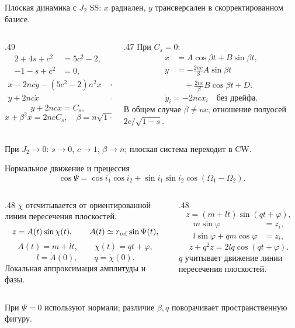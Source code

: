 \documentclass[11pt,aspectratio=169,t]{beamer}
\newcommand{\eqcompact}{\fontsize{10}{12}\selectfont}
\newcommand{\derivationmathspacing}{%
  \setlength{\abovedisplayskip}{2pt}%
  \setlength{\belowdisplayskip}{3pt}%
  \setlength{\abovedisplayshortskip}{2pt}%
  \setlength{\belowdisplayshortskip}{2pt}%
  \setlength{\jot}{2pt}}
\begin{document}
\begin{frame}{Плоская динамика с $J_2$}
\relax
\derivationmathspacing
SS: $x$ радиален, $y$ трансверсален в скорректированном базисе.
\begin{columns}[T,onlytextwidth]
\begin{column}{.49\textwidth}
{\eqcompact\derivationmathspacing
\[
\begin{aligned}
 2+4s+c^2&=5c^2-2,\\
 -1-s+c^2&=0,
\end{aligned}
\]
\[
 \boxed{\begin{aligned}
 \ddot x-2nc\dot y-(5c^2-2)n^2x&=0,\\[4pt]
 \ddot y+2nc\dot x&=0.
 \end{aligned}}
\]
\[
 \dot y+2ncx=C_s,
\]
\[
 \boxed{\ddot x+\beta^2x=2ncC_s,\quad
 \beta=n\sqrt{1-s}.}
\]
}
\end{column}
\begin{column}{.47\textwidth}
При $C_s=0$:
{\eqcompact\derivationmathspacing
\[
\begin{aligned}
 x&=A\cos\beta t+B\sin\beta t,\\[4pt]
 y&=-\frac{2nc}{\beta}A\sin\beta t\\[-1pt]
  &\quad+\frac{2nc}{\beta}B\cos\beta t+D.
\end{aligned}
\]
\[
 \dot y_i=-2ncx_i\quad\text{без дрейфа}.
\]
}
\justifying
В общем случае $\beta\ne nc$; отношение полуосей $2c/\sqrt{1-s}$.
\end{column}
\end{columns}
\smallskip
При $J_2\to0$: $s\to0$, $c\to1$, $\beta\to n$; плоская система переходит в CW.
\end{frame}

\begin{frame}{Нормальное движение и прецессия}
\relax
\derivationmathspacing
{\eqcompact\derivationmathspacing
\[
 \cos\Psi=\cos i_1\cos i_2+
          \sin i_1\sin i_2\cos(\Omega_1-\Omega_2).
\]
}
\begin{columns}[T,onlytextwidth]
\begin{column}{.48\textwidth}
\justifying
$\chi$ отсчитывается от ориентированной линии пересечения плоскостей.
{\eqcompact\derivationmathspacing
\[
 z=A(t)\sin\chi(t),\qquad
 A(t)\simeq r_{\rm ref}\sin\Psi(t),
\]
\[
 A(t)=m+lt,\qquad \chi(t)=qt+\varphi,
\]
\[
 l=\dot A(0),\qquad q=\dot\chi(0).
\]
}
Локальная аппроксимация амплитуды и фазы.
\end{column}
\begin{column}{.48\textwidth}
{\eqcompact\derivationmathspacing
\[
 z=(m+lt)\sin(qt+\varphi),
\]
\[
\begin{aligned}
 m\sin\varphi&=z_i,\\[4pt]
 l\sin\varphi+qm\cos\varphi&=\dot z_i,
\end{aligned}
\]
\[
 \boxed{\ddot z+q^2z=2lq\cos(qt+\varphi).}
\]
}
\justifying
$q$ учитывает движение линии пересечения плоскостей.
\end{column}
\end{columns}
\smallskip
\justifying
При $\Psi=0$ используют нормали; различие $\beta,q$ поворачивает пространственную фигуру.
\end{frame}
\end{document}
